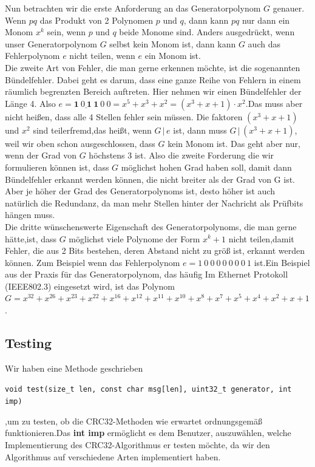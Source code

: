 \documentclass[course=erap]{aspdoc}
\begin{document}
Nun betrachten wir die erste Anforderung an das Generatorpolynom $G$ genauer. Wenn $pq$ das Produkt von 2 Polynomen $p$ und $q$, dann kann $pq$ nur dann ein Monom $x^k$ sein, wenn $p$ und $q$ beide Monome sind. Anders ausgedrückt, wenn unser Generatorpolynom $G$ selbst kein Monom ist, dann kann $G$ auch das Fehlerpolynom $e$ nicht teilen, wenn $e$ ein Monom ist. \\

Die zweite Art von Fehler, die man gerne erkennen möchte, ist die sogenannten Bündelfehler. Dabei geht es darum, dass eine ganze Reihe von Fehlern in einem räumlich begrenzten Bereich auftreten. Hier nehmen wir einen Bündelfehler der Länge 4. Also $e = \underline{\textbf{1}\:0\:\textbf{1}\:\textbf{1}}\:0\:0 = x^5+x^3+x^2 = (x^3+x+1)\cdot{x^2}$.Das muss aber nicht heißen, dass alle 4 Stellen fehler sein müssen. Die faktoren $(x^3+x+1)$ und ${x^2}$ sind teilerfremd,das heißt, wenn $G\,|\,e$ ist, dann muss $G\,|\,(x^3+x+1)$, weil wir oben schon ausgeschlossen, dass $G$ kein Monom ist. Das geht aber nur, wenn der Grad von $G$ höchstens 3 ist. Also die zweite Forderung die wir formulieren können ist, dass $G$ möglichst hohen Grad haben soll, damit dann Bündelfehler erkannt werden können, die nicht breiter als der Grad von G ist. Aber je höher der Grad des Generatorpolynoms ist, desto höher ist auch natürlich die Redundanz, da man mehr Stellen hinter der Nachricht als Prüfbits hängen muss.\\

Die dritte wünschenswerte Eigenschaft des Generatorpolynoms, die man gerne hätte,ist, dass $G$ möglichst viele Polynome der Form $x^k+1$ nicht teilen,damit Fehler, die aus 2 Bits bestehen, deren Abstand nicht zu größ ist, erkannt werden können. Zum Beispiel wenn das Fehlerpolynom $e = 1\:0\:0\:0\:0\:0\:0\:0\:1$ ist.Ein Beispiel aus der Praxis für das Generatorpolynom, das häufig Im Ethernet Protokoll (IEEE802.3) eingesetzt wird, ist das Polynom $G =  x^{32} + x^{26} + x^{23} + x^{22} + x^{16} + x^{12} + x^{11} + x^{10} + x^8 + x^7 + x^5 + x^4 + x^2 + x + 1$.\\

\subsection{Testing}
Wir haben eine Methode geschrieben
\begin{center}
    \texttt{void test(size\_t len, const char msg[len], uint32\_t generator, int imp)} \\
\end{center}
,um zu testen, ob die CRC32-Methoden wie erwartet ordnungsgemäß funktionieren.Das \textbf{int imp} ermöglicht es dem Benutzer, auszuwählen, welche Implementierung des CRC32-Algorithmus er testen möchte, da wir den Algorithmus auf verschiedene Arten implementiert haben.
\end{document}
